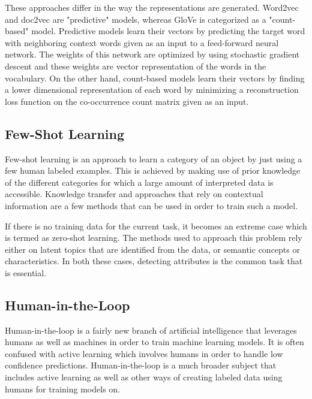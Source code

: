 \documentclass[11pt,letterpaper]{article}
\begin{document}
These approaches differ in the way the representations are generated.  Word2vec and doc2vec are "predictive" models, whereas GloVe is categorized as a "count-based" model.  Predictive models learn their vectors by predicting the target word with neighboring context words given as an input to a feed-forward neural network.  The weights of this network are optimized by using stochastic gradient descent and these weights are vector representation of the words in the vocabulary.  On the other hand, count-based models learn their vectors by finding a lower dimensional representation of each word by minimizing a reconstruction loss function on the co-occurrence count matrix given as an input.

\subsection*{Few-Shot Learning}
Few-shot learning is an approach to learn a category of an object by just using a few human labeled examples.  This is achieved by making use of prior knowledge of the different categories for which a large amount of interpreted data is accessible.  Knowledge transfer and approaches that rely on contextual information are a few methods that can be used in order to train such a model.

If there is no training data for the current task, it becomes an extreme case which is termed as zero-shot learning.  The methods used to approach this problem rely either on latent topics that are identified from the data, or semantic concepts or characteristics.  In both these cases, detecting attributes is the common task that is essential.

\subsection*{Human-in-the-Loop}
Human-in-the-loop is a fairly new branch of artificial intelligence that leverages humans as well as machines in order to train machine learning models. It is often confused with active learning which involves humans in order to handle low confidence predictions.  Human-in-the-loop is a much broader subject that includes active learning as well as other ways of creating labeled data using humans for training models on.
\end{document}
